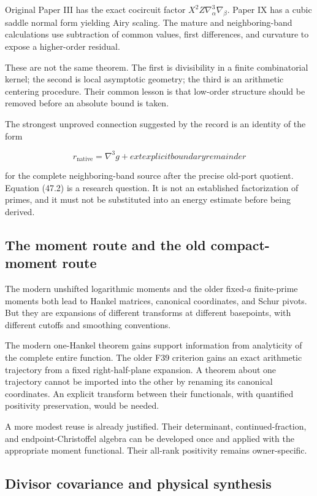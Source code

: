 \documentclass[
  10pt,
  a4paper,
  10pt,
  oneside,
  openany]{book}
\begin{document}
Original Paper III has the exact cocircuit factor
\(X^2Z\nabla_\alpha^3\nabla_\beta\). Paper IX has a cubic saddle normal
form yielding Airy scaling. The mature and neighboring-band calculations
use subtraction of common values, first differences, and curvature to
expose a higher-order residual.

These are not the same theorem. The first is divisibility in a finite
combinatorial kernel; the second is local asymptotic geometry; the third
is an arithmetic centering procedure. Their common lesson is that
low-order structure should be removed before an absolute bound is taken.

The strongest unproved connection suggested by the record is an identity
of the form

\[
 r_{\mathrm{native}}=\nabla^3 g+    ext{explicit boundary remainder}
 \tag{47.2}\label{eq:47.2}
\]

for the complete neighboring-band source after the precise old-port
quotient. Equation (47.2) is a research question. It is not an
established factorization of primes, and it must not be substituted into
an energy estimate before being derived.

\subsection{The moment route and the old compact-moment
route}\label{the-moment-route-and-the-old-compact-moment-route}

The modern unshifted logarithmic moments and the older fixed-\(a\)
finite-prime moments both lead to Hankel matrices, canonical
coordinates, and Schur pivots. But they are expansions of different
transforms at different basepoints, with different cutoffs and smoothing
conventions.

The modern one-Hankel theorem gains support information from analyticity
of the complete entire function. The older F39 criterion gains an exact
arithmetic trajectory from a fixed right-half-plane expansion. A theorem
about one trajectory cannot be imported into the other by renaming its
canonical coordinates. An explicit transform between their functionals,
with quantified positivity preservation, would be needed.

A more modest reuse is already justified. Their determinant,
continued-fraction, and endpoint-Christoffel algebra can be developed
once and applied with the appropriate moment functional. Their all-rank
positivity remains owner-specific.

\subsection{Divisor covariance and physical
synthesis}\label{divisor-covariance-and-physical-synthesis}
\end{document}
